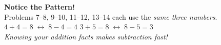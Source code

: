 \documentclass[12pt, letterpaper]{article}
\begin{document}
\bigskip
\begin{checkbox}
\textbf{\color{sd-green}Notice the Pattern!}\\[3pt]
Problems 7--8, 9--10, 11--12, 13--14 each use the \emph{same three numbers}.\\
$4+4=8 \;\longleftrightarrow\; 8-4=4$ \qquad $3+5=8 \;\longleftrightarrow\; 8-5=3$\\[3pt]
\textit{Knowing your addition facts makes subtraction fast!}
\end{checkbox}
\end{document}
